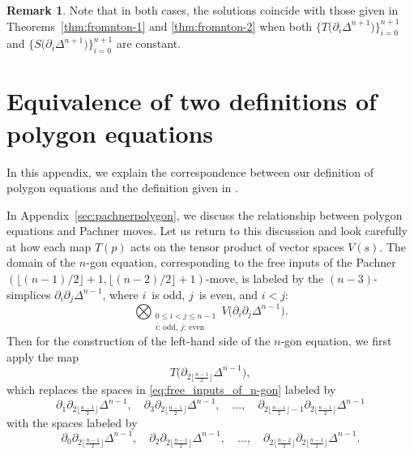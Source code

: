 \documentclass[10pt,a4paper]{amsart}
\numberwithin{equation}{section}
\theoremstyle{definition}
\newtheorem{Remark}[Theorem]{Remark}
\begin{document}
\begin{Remark}
 Note that in both cases, the solutions coincide with those given in Theorems~\ref{thm:fromnton-1} and \ref{thm:fromnton-2} when both $\bigl\{T\bigl(\partial_i\Delta^{n+1}\bigr)\bigr\}_{i=0}^{n+1}$ and $\bigl\{S\bigl(\partial_i\Delta^{n+1}\bigr)\bigr\}_{i=0}^{n+1}$ are constant.
\end{Remark}


\section{Equivalence of two definitions of polygon equations}\label{sec:equivalence}
In this appendix, we explain the correspondence between our definition of polygon equations and the definition given in \cite{dimakis2015simplex}.

In Appendix~\ref{sec:pachnerpolygon}, we discuss the relationship between polygon equations and Pachner moves. Let us return to this discussion and look carefully at how each map $T(p)$ acts on the tensor product of vector spaces $V(s)$.
The domain of the $n$-gon equation, corresponding to the free inputs of the Pachner $(\lfloor(n-1)/2\rfloor+1,\lfloor (n-2)/2\rfloor+1)$-move, is labeled by the $(n-3)$-simplices $\partial_i\partial_j\Delta^{n-1}$, where $i$~is odd, $j$~is even, and $i<j$:
\begin{equation}\label{eq:free_inputs_of_n-gon}
 \bigotimes_{\substack{0\leq i<j\leq n-1\\\text{$i$: odd, $j$: even}}} V\bigl(\partial_i\partial_j\Delta^{n-1}\bigr).
\end{equation}
Then for the construction of the left-hand side of the $n$-gon equation, we first apply the map
\[
T\bigl(\partial_{2\lfloor\frac{n-1}{2}\rfloor}\Delta^{n-1}\bigr),
\]
which replaces the spaces in \eqref{eq:free_inputs_of_n-gon} labeled by
\begin{equation*}
 \partial_1\partial_{2\lfloor\frac{n-1}{2}\rfloor}\Delta^{n-1},\quad \partial_3\partial_{2\lfloor\frac{n-1}{2}\rfloor}\Delta^{n-1},\quad\dots,\quad\partial_{2\lfloor\frac{n-1}{2}\rfloor-1}\partial_{2\lfloor\frac{n-1}{2}\rfloor}\Delta^{n-1}
\end{equation*}
with the spaces labeled by
\begin{equation*}
 \partial_0\partial_{2\lfloor\frac{n-1}{2}\rfloor}\Delta^{n-1},\quad \partial_2\partial_{2\lfloor\frac{n-1}{2}\rfloor}\Delta^{n-1},\quad\dots,\quad \partial_{2\lfloor\frac{n-2}{2}\rfloor}\partial_{2\lfloor\frac{n-1}{2}\rfloor}\Delta^{n-1}.
\end{equation*}
\end{document}
